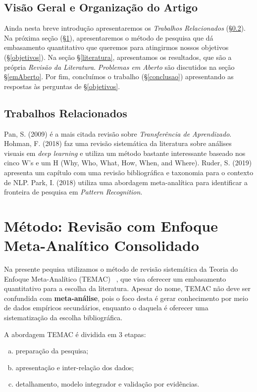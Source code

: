 \documentclass[sigconf]{acmart}
\begin{document}
  \subsection{Visão Geral e Organização do Artigo}
  Ainda nesta breve introdução apresentaremos os \emph{Trabalhos Relacionados} (\S\ref{related}). Na próxima seção (\S\ref{TEMAC}), apresentaremos o método de pesquisa que dá embasamento quantitativo que queremos para atingirmos nossos objetivos (\S\ref{objetivos}). Na seção \S\ref{literatura}, apresentamos os resultados, que são a própria  \emph{Revisão da Literatura}. \emph{Problemas em Aberto} são discutidos na seção \S\ref{emAberto}. Por fim, concluímos o trabalho (\S\ref{conclusao}) apresentando as respostas às perguntas de \S\ref{objetivos}.
  

  \subsection{Trabalhos Relacionados}\label{related}
  Pan, S. (2009)\cite{PanYang} é a mais citada revisão sobre \emph{Transferência de Aprendizado}. Hohman, F. (2018)\cite{hohman2018visual} faz uma revisão sistemática da literatura sobre análises visuais em \emph{deep learning} e utiliza um método bastante interessante baseado nos cinco W's e um H (Why, Who, What, How, When, and Where). Ruder, S. (2019) \cite{Ruder2019Neural} apresenta um capítulo com uma revisão bibliográfica e taxonomia para o contexto de NLP. Park, I. (2018)\cite{park2018identifying} utiliza uma abordagem meta-analítica para identificar a fronteira de pesquisa em \emph{Pattern Recognition}.
\section{Método: Revisão com Enfoque Meta-Analítico Consolidado}\label{TEMAC}
Na presente pequisa utilizamos o método de revisão sistemática da Teoria do Enfoque Meta-Analítico (TEMAC) ~\cite{Mariano}, que visa oferecer um embasamento quantitativo para a escolha da literatura. Apesar do nome, TEMAC não deve ser confundida com \textbf{meta-análise}, pois o foco desta é gerar conhecimento por meio de dados empíricos secundários, enquanto o daquela é oferecer uma sistematização da escolha bibliográfica.

A abordagem TEMAC é dividida em 3 etapas: 
\begin{enumerate}[a)]
  \item preparação da pesquisa;
  \item apresentação e inter-relação dos dados;
  \item detalhamento, modelo integrador e validação por evidências.
\end{enumerate}
\end{document}
